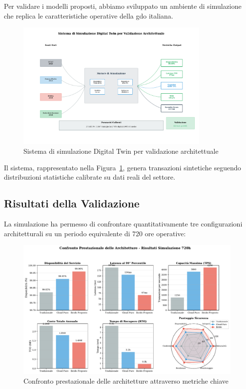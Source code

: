 Per validare i modelli proposti, abbiamo sviluppato un ambiente di simulazione che replica le caratteristiche operative della \gls{gdo} italiana.

\begin{figure}[htbp]
\centering
\includegraphics[width=0.85\textwidth]{thesis_figures/cap4/fig_3_4_simulation_system.pdf}
\caption{Sistema di simulazione Digital Twin per validazione architettuale}
\label{fig:simulation-system}
\end{figure}

Il sistema, rappresentato nella Figura~\ref{fig:simulation-system}, genera transazioni sintetiche seguendo distribuzioni statistiche calibrate su dati reali del settore\autocite{federdistribuzione2024}.

\subsection{Risultati della Validazione}
\label{subsec:risultati-validazione}

La simulazione ha permesso di confrontare quantitativamente tre configurazioni architetturali su un periodo equivalente di 720 ore operative:

\begin{figure}[htbp]
\centering
\includegraphics[width=\textwidth]{thesis_figures/cap4/fig_3_6_performance_comparison.pdf}
\caption{Confronto prestazionale delle architetture attraverso metriche chiave}
\label{fig:performance-comparison}
\end{figure}

